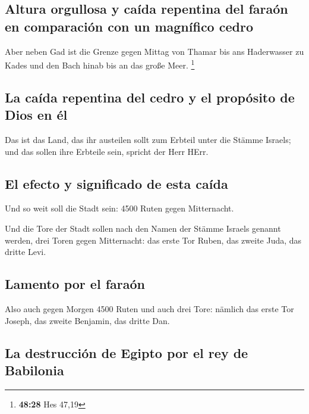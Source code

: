\hypertarget{altura-orgullosa-y-cauxedda-repentina-del-farauxf3n-en-comparaciuxf3n-con-un-magnuxedfico-cedro}{%
\subsection{Altura orgullosa y caída repentina del faraón en comparación
con un magnífico
cedro}\label{altura-orgullosa-y-cauxedda-repentina-del-farauxf3n-en-comparaciuxf3n-con-un-magnuxedfico-cedro}}

 Aber neben Gad ist die Grenze gegen Mittag von Thamar
bis ans Haderwasser zu Kades und den Bach hinab bis an das große Meer.
\footnote{\textbf{48:28} Hes 47,19}

\hypertarget{la-cauxedda-repentina-del-cedro-y-el-propuxf3sito-de-dios-en-uxe9l}{%
\subsection{La caída repentina del cedro y el propósito de Dios en
él}\label{la-cauxedda-repentina-del-cedro-y-el-propuxf3sito-de-dios-en-uxe9l}}

 Das ist das Land, das ihr austeilen sollt zum Erbteil
unter die Stämme Israels; und das sollen ihre Erbteile sein, spricht der
Herr HErr.

\hypertarget{el-efecto-y-significado-de-esta-cauxedda}{%
\subsection{El efecto y significado de esta
caída}\label{el-efecto-y-significado-de-esta-cauxedda}}

 Und so weit soll die Stadt sein: 4500 Ruten gegen
Mitternacht.

 Und die Tore der Stadt sollen nach den Namen der Stämme
Israels genannt werden, drei Toren gegen Mitternacht: das erste Tor
Ruben, das zweite Juda, das dritte Levi.

\hypertarget{lamento-por-el-farauxf3n}{%
\subsection{Lamento por el faraón}\label{lamento-por-el-farauxf3n}}

 Also auch gegen Morgen 4500 Ruten und auch drei Tore:
nämlich das erste Tor Joseph, das zweite Benjamin, das dritte Dan.

\hypertarget{la-destrucciuxf3n-de-egipto-por-el-rey-de-babilonia}{%
\subsection{La destrucción de Egipto por el rey de
Babilonia}\label{la-destrucciuxf3n-de-egipto-por-el-rey-de-babilonia}}

